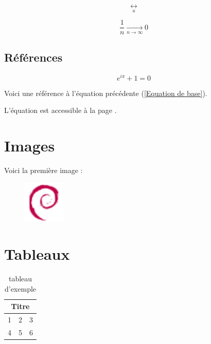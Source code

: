 \documentclass[a4paper]{article}
\begin{document}
\begin{equation}
\underset{a}{\longleftrightarrow}
\end{equation}


\begin{equation}
\frac{1}{n} \xrightarrow[n \rightarrow \infty]{} 0
\end{equation}

\subsection{Références}

\begin{equation}\label{Equation de base}
e^{i\pi}+1=0
\end{equation}

Voici une référence à l'équation précédente (\ref{Equation de base}).

L'équation est accessible à la page \pageref{Equation de base}.

\section{Images}

Voici la première image :
\begin{figure}[h] %
\begin{center}
\includegraphics[height=2cm]{debian-logo}
\end{center}
\end{figure}


\section{Tableaux}

\begin{table}[!h] %
\begin{center}
	
\begin{tabular}{|c|c|c|}
	\hline
	\multicolumn{3}{|c|}{Titre} \\ \hline
	1	&	2	&	3 \\ \hline
	4	&	5	&	6 \\ \hline
\end{tabular}

\caption{tableau d'exemple}
\end{center}
\end{table}
\end{document}

